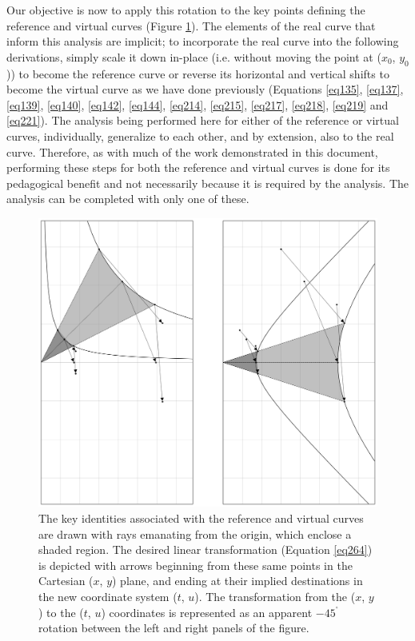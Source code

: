 \documentclass{article}
\begin{document}
Our objective is now to apply this rotation to the key points defining the reference and virtual curves (Figure \ref{fig51}). The elements of the real curve that inform this analysis are implicit; to incorporate the real curve into the following derivations, simply scale it down in-place (i.e. without moving the point at ($x_{0}$, $y_{0}$)) to become the reference curve or reverse its horizontal and vertical shifts to become the virtual curve as we have done previously (Equations \ref{eq135}, \ref{eq137}, \ref{eq139}, \ref{eq140}, \ref{eq142}, \ref{eq144}, \ref{eq214}, \ref{eq215}, \ref{eq217}, \ref{eq218}, \ref{eq219} and \ref{eq221}). The analysis being performed here for either of the reference or virtual curves, individually, generalize to each other, and by extension, also to the real curve. Therefore, as with much of the work demonstrated in this document, performing these steps for both the reference and virtual curves is done for its pedagogical benefit and not necessarily because it is required by the analysis. The analysis can be completed with only one of these.

\begin{figure}[ht]
    \centering
    \includegraphics[width=\textwidth]{fig51.png}
    \captionsetup{
        justification=raggedright,
        singlelinecheck=false,
        font=small,
        labelfont=bf,
        labelsep=quad,
        format=plain
    }
    \caption{The key identities associated with the reference and virtual curves are drawn with rays emanating from the origin, which enclose a shaded region. The desired linear transformation (Equation \ref{eq264}) is depicted with arrows beginning from these same points in the Cartesian ($x$, $y$) plane, and ending at their implied destinations in the new coordinate system ($t$, $u$). The transformation from the ($x$, $y$) to the ($t$, $u$) coordinates is represented as an apparent ${- 45}^{{^\circ}}$ rotation between the left and right panels of the figure.}
    \label{fig51}
\end{figure}
\end{document}
